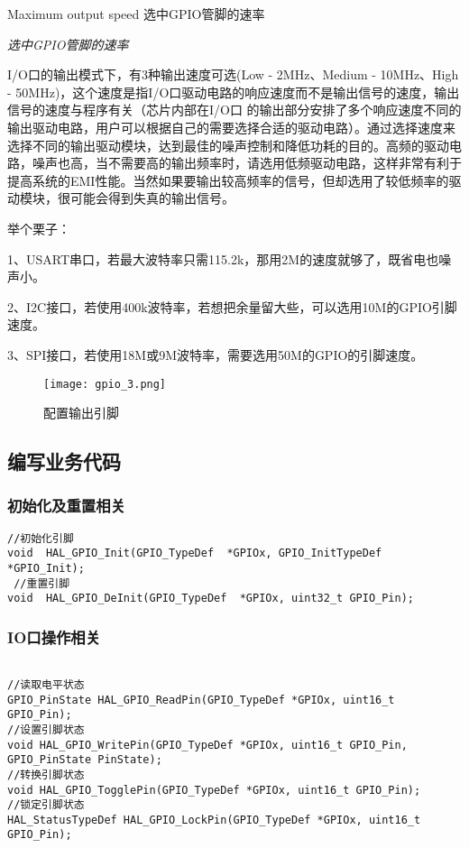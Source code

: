 \documentclass[cn,11pt]{elegantbook}
\begin{document}
Maximum output speed 选中GPIO管脚的速率

\emph{选中GPIO管脚的速率}

I/O口的输出模式下，有3种输出速度可选(Low - 2MHz、Medium - 10MHz、High - 50MHz)，这个速度是指I/O口驱动电路的响应速度而不是输出信号的速度，输出信号的速度与程序有关（芯片内部在I/O口 的输出部分安排了多个响应速度不同的输出驱动电路，用户可以根据自己的需要选择合适的驱动电路）。通过选择速度来选择不同的输出驱动模块，达到最佳的噪声控制和降低功耗的目的。高频的驱动电路，噪声也高，当不需要高的输出频率时，请选用低频驱动电路，这样非常有利于提高系统的EMI性能。当然如果要输出较高频率的信号，但却选用了较低频率的驱动模块，很可能会得到失真的输出信号。

举个栗子：

1、USART串口，若最大波特率只需115.2k，那用2M的速度就够了，既省电也噪声小。

2、I2C接口，若使用400k波特率，若想把余量留大些，可以选用10M的GPIO引脚速度。

3、SPI接口，若使用18M或9M波特率，需要选用50M的GPIO的引脚速度。

\begin{figure}[htbp]
	\centering
	\texttt{[image: gpio\_3.png]}
	\caption{配置输出引脚 \label{fig:scatter}}
	
\end{figure}

\newpage

\subsection{编写业务代码}

\subsubsection{初始化及重置相关}

\lstset{  language=C}
\begin{lstlisting}
//初始化引脚
void  HAL_GPIO_Init(GPIO_TypeDef  *GPIOx, GPIO_InitTypeDef *GPIO_Init); 
 //重置引脚
void  HAL_GPIO_DeInit(GPIO_TypeDef  *GPIOx, uint32_t GPIO_Pin);
\end{lstlisting}

\subsubsection{IO口操作相关}

\lstset{language=C}
\begin{lstlisting}

//读取电平状态
GPIO_PinState HAL_GPIO_ReadPin(GPIO_TypeDef *GPIOx, uint16_t GPIO_Pin);
//设置引脚状态
void HAL_GPIO_WritePin(GPIO_TypeDef *GPIOx, uint16_t GPIO_Pin, GPIO_PinState PinState);
//转换引脚状态
void HAL_GPIO_TogglePin(GPIO_TypeDef *GPIOx, uint16_t GPIO_Pin);
//锁定引脚状态
HAL_StatusTypeDef HAL_GPIO_LockPin(GPIO_TypeDef *GPIOx, uint16_t GPIO_Pin);

\end{lstlisting}
\end{document}
